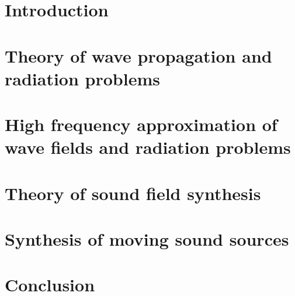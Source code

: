 \documentclass[%
	paper=A4,					%
	twoside=true,				%
	openright,					%
	chapterprefix=true,			%
	11pt,						%
	headings=normal,			%
	bibliography=totoc,			%
	listof=totoc,				%
	titlepage=on,				%
	captions=tableabove,		%
	draft=false,				%
]{scrreprt}
\begin{document}
\EveryShipout{%
  \ifthenelse{\isodd{\value{page}}}%
    {\global\marginparsep=20pt}%
    {\global\marginparsep=5pt}%
}



\pagestyle{empty}				%
\cleardoublepage



\cleardoublepage

\pagestyle{plain}				%
\setcounter{tocdepth}{2}		%
\tableofcontents				%
\cleardoublepage
{}			%
\setcounter{page}{1}			%
\pagestyle{maincontentstyle} 	%

%

\chapter{Introduction}
\label{sec:introduction}


\chapter{Theory of wave propagation and radiation problems}
\label{sec:general_wave_theory}


\chapter{High frequency approximation of wave fields and radiation problems}
\label{sec:high_freq_approx}


\chapter{Theory of sound field synthesis}
\label{sec:sound_field_synthesis}


\chapter{Synthesis of moving sound sources}
\label{sec:moving_source_synthesis}


\chapter{Conclusion}
\label{sec:conclusion}

\end{document}
